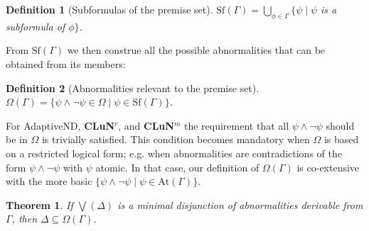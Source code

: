 \documentclass[]{article}
\newtheorem{definition}{Definition}
\newtheorem{theorem}{Theorem}
\newcommand{\Turn}[2]
    { {#1}\vdash_{\textbf{\sf s}}  {#2}}
\newcommand{\TurnPrime}[2]
    { {#1}\vdash_{\textbf{\sf s'}}  {#2}}
\newcommand{\Sf}{\ensuremath{\mathrm{Sf}}}
\newcommand{\At}{\ensuremath{\mathrm{At}}}
\begin{document}


\begin{definition}[Subformulas of the premise set]
$\Sf(\Gamma)=\bigcup_{\phi \in \Gamma} \{\psi \mid \psi$ is a subformula of $ \phi\}$.
\end{definition}


From $\Sf(\Gamma)$ we then construe all the possible abnormalities that can be obtained from its members:

\begin{definition}[Abnormalities relevant to the premise set]
$\Omega(\Gamma)=\{\psi\wedge \neg \psi \in \Omega \mid \psi\in \Sf(\Gamma)\}$.
\end{definition}
For \textsf{AdaptiveND}, \textbf{CLuN$^r$}, and \textbf{CLuN$^m$} the requirement that all $\psi\wedge \neg \psi$ should be in $\Omega$ is trivially satisfied. This condition becomes mandatory when $\Omega$ is based on a restricted logical form; e.g. when abnormalities are contradictions of the form $\psi \wedge \neg \psi$ with $\psi$ atomic. In that case, our definition of $\Omega(\Gamma)$ is co-extensive with the more basic $\{\psi \wedge \neg \psi \mid \psi \in \At(\Gamma)\}$.
%
%
\begin{theorem}\label{thm:subform}
    If $\bigvee(\Delta)$ is a minimal disjunction of abnormalities derivable from $\Gamma$, then $\Delta \subseteq \Omega(\Gamma)$.
\end{theorem}
\end{document}
